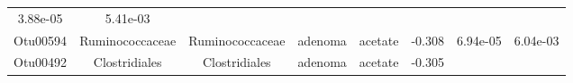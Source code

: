 \documentclass[11pt,]{article}
\begin{document}
\begin{longtable}[]{@{}cccccccc@{}}
\begin{minipage}[t]{0.08\columnwidth}
3.88e-05\strut
\end{minipage} & \begin{minipage}[t]{0.08\columnwidth}\centering\strut
5.41e-03\strut
\end{minipage}\tabularnewline
\begin{minipage}[t]{0.08\columnwidth}\centering\strut
Otu00594\strut
\end{minipage} & \begin{minipage}[t]{0.15\columnwidth}\centering\strut
Ruminococcaceae\strut
\end{minipage} & \begin{minipage}[t]{0.15\columnwidth}\centering\strut
Ruminococcaceae\strut
\end{minipage} & \begin{minipage}[t]{0.08\columnwidth}\centering\strut
adenoma\strut
\end{minipage} & \begin{minipage}[t]{0.09\columnwidth}\centering\strut
acetate\strut
\end{minipage} & \begin{minipage}[t]{0.07\columnwidth}\centering\strut
-0.308\strut
\end{minipage} & \begin{minipage}[t]{0.08\columnwidth}\centering\strut
6.94e-05\strut
\end{minipage} & \begin{minipage}[t]{0.08\columnwidth}\centering\strut
6.04e-03\strut
\end{minipage}\tabularnewline
\begin{minipage}[t]{0.08\columnwidth}\centering\strut
Otu00492\strut
\end{minipage} & \begin{minipage}[t]{0.15\columnwidth}\centering\strut
Clostridiales\strut
\end{minipage} & \begin{minipage}[t]{0.15\columnwidth}\centering\strut
Clostridiales\strut
\end{minipage} & \begin{minipage}[t]{0.08\columnwidth}\centering\strut
adenoma\strut
\end{minipage} & \begin{minipage}[t]{0.09\columnwidth}\centering\strut
acetate\strut
\end{minipage} & \begin{minipage}[t]{0.07\columnwidth}\centering\strut
-0.305\strut
\end{minipage} & \begin{minipage}[t]{0.08\columnwidth}\centering\strut

\end{minipage}
\end{longtable}
\end{document}
